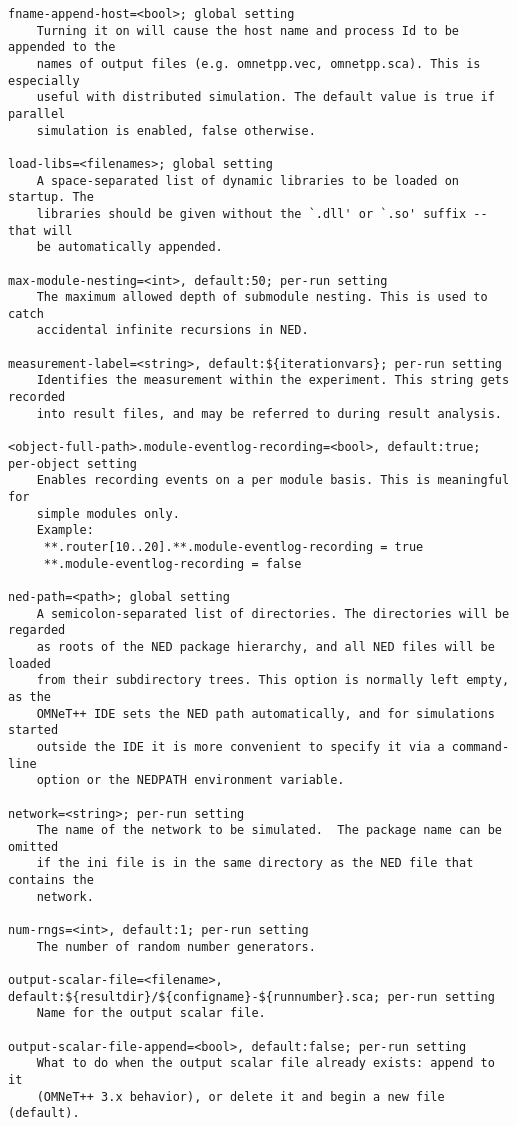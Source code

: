 \begin{verbatim}
fname-append-host=<bool>; global setting
    Turning it on will cause the host name and process Id to be appended to the
    names of output files (e.g. omnetpp.vec, omnetpp.sca). This is especially
    useful with distributed simulation. The default value is true if parallel
    simulation is enabled, false otherwise.

load-libs=<filenames>; global setting
    A space-separated list of dynamic libraries to be loaded on startup. The
    libraries should be given without the `.dll' or `.so' suffix -- that will
    be automatically appended.

max-module-nesting=<int>, default:50; per-run setting
    The maximum allowed depth of submodule nesting. This is used to catch
    accidental infinite recursions in NED.

measurement-label=<string>, default:${iterationvars}; per-run setting
    Identifies the measurement within the experiment. This string gets recorded
    into result files, and may be referred to during result analysis.

<object-full-path>.module-eventlog-recording=<bool>, default:true; per-object setting
    Enables recording events on a per module basis. This is meaningful for
    simple modules only.
    Example:
     **.router[10..20].**.module-eventlog-recording = true
     **.module-eventlog-recording = false

ned-path=<path>; global setting
    A semicolon-separated list of directories. The directories will be regarded
    as roots of the NED package hierarchy, and all NED files will be loaded
    from their subdirectory trees. This option is normally left empty, as the
    OMNeT++ IDE sets the NED path automatically, and for simulations started
    outside the IDE it is more convenient to specify it via a command-line
    option or the NEDPATH environment variable.

network=<string>; per-run setting
    The name of the network to be simulated.  The package name can be omitted
    if the ini file is in the same directory as the NED file that contains the
    network.

num-rngs=<int>, default:1; per-run setting
    The number of random number generators.

output-scalar-file=<filename>, default:${resultdir}/${configname}-${runnumber}.sca; per-run setting
    Name for the output scalar file.

output-scalar-file-append=<bool>, default:false; per-run setting
    What to do when the output scalar file already exists: append to it
    (OMNeT++ 3.x behavior), or delete it and begin a new file (default).


\end{verbatim}
